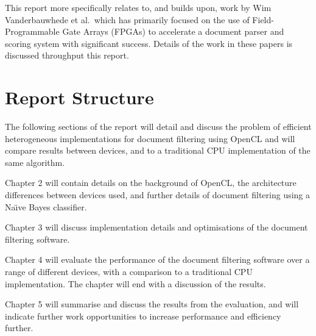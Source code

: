 This report more specifically relates to, and builds upon, work by Wim
Vanderbauwhede et al.\ which has primarily focused on the use of Field-
Programmable Gate Arrays (FPGAs) to accelerate a document parser and scoring
system \cite{vanderbauwhede2013high} \cite{HybridCPUFPGA}
\cite{chalamalasetti2012evaluating} with significant success. Details of the
work in these papers is discussed throughput this report.

\section{Report Structure}

The following sections of the report will detail and discuss the problem of
efficient heterogeneous implementations for document filtering using OpenCL and
will compare results between devices, and to a traditional CPU implementation of
the same algorithm.

Chapter 2 will contain details on the background of OpenCL, the architecture
differences between devices used, and further details of document filtering
using a Na{\"{\i}}ve Bayes classifier.

Chapter 3 will discuss implementation details and optimisations of the document
filtering software.

Chapter 4 will evaluate the performance of the document filtering software over
a range of different devices, with a comparison to a traditional CPU
implementation. The chapter will end with a discussion of the results.

Chapter 5 will summarise and discuss the results from the evaluation, and will
indicate further work opportunities to increase performance and efficiency
further.
